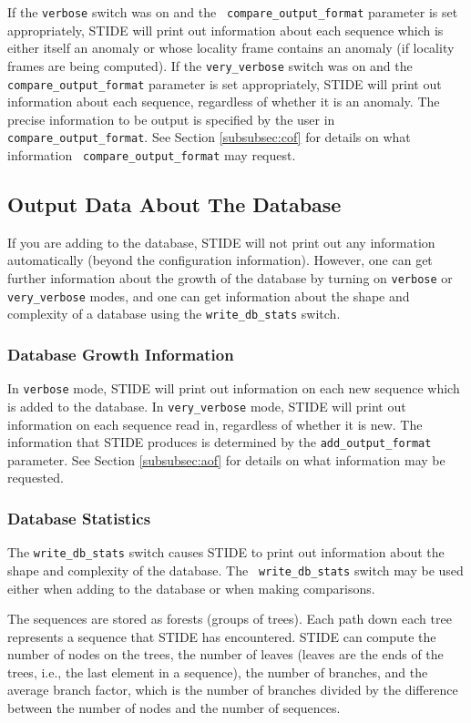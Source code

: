 \documentclass{amsart}
\begin{document}
If the {\tt verbose} switch was on and the {\tt
  compare\_output\_format} parameter is set appropriately, STIDE will
print out information about each sequence which is either itself an
anomaly or whose locality frame contains an anomaly (if locality
frames are being computed).  If the {\tt very\_verbose} switch was on
and the {\tt compare\_output\_format} parameter is set appropriately,
STIDE will print out information about each sequence, regardless of
whether it is an anomaly.  The precise information to be output is
specified by the user in {\tt compare\_output\_format}.  See Section
\ref{subsubsec:cof} for details on what information {\tt
  compare\_output\_format} may request.

\subsection{Output Data About The Database}

If you are adding to the database, STIDE will not print out any
information automatically (beyond the configuration information).
However, one can get further information about the growth of the
database by turning on {\tt verbose} or {\tt very\_verbose} modes, and
one can get information about the shape and complexity of a database
using the {\tt write\_db\_stats} switch.

\subsubsection{Database Growth Information}

In {\tt verbose} mode, STIDE will print out information on each new
sequence which is added to the database.  In {\tt very\_verbose} mode,
STIDE will print out information on each sequence read in, regardless
of whether it is new.  The information that STIDE produces is
determined by the {\tt add\_output\_format} parameter.  See Section
\ref{subsubsec:aof} for details on what information may be requested.

\subsubsection{Database Statistics}

The {\tt write\_db\_stats} switch causes STIDE to print out
information about the shape and complexity of the database.  The {\tt
write\_db\_stats} switch may be used either when adding to the
database or when making comparisons.

The sequences are stored as forests (groups of trees).  Each path down
each tree represents a sequence that STIDE has encountered.  STIDE can
compute the number of nodes on the trees, the number of leaves (leaves
are the ends of the trees, i.e., the last element in a sequence), the
number of branches, and the average branch factor, which is the number
of branches divided by the difference between the number of nodes and
the number of sequences.
\end{document}
